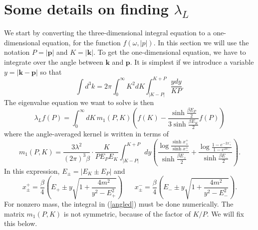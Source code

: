 \documentclass[12pt]{article}
\newcommand{\be}{\begin{equation}}
\newcommand{\ee}{\end{equation}}
\renewcommand{\k}{\mathbf{k}}
\newcommand{\p}{\mathbf{p}}
\begin{document}
\section{Some details on finding $\lambda_L$}\label{numericsapp}

We start by converting the three-dimensional integral equation to a one-dimensional equation, for the function $f(\omega,|p|)$. In this section we will use the notation $P = |\p|$ and $K = |\k|$. To get the one-dimensional equation, we have to integrate over the angle between $\k$ and $\p$. It is simplest if we introduce a variable $y = |\k - \p|$ so that
\be
\int d^3k = 2\pi \int_0^\infty K^2dK\int_{|K-P|}^{K+P} \frac{y dy}{KP}.
\ee
The eigenvalue equation we want to solve is then
\be
\lambda_L f(P) = \int_0^\infty dK \,m_1(P,K)\left(f(K) - \frac{\sinh \frac{\beta E_P}{2}}{3\sinh\frac{\beta E_K}{2}} f(P)\right)\ee
where the angle-averaged kernel is written in terms of 
\be
m_1(P,K) = \frac{3\lambda^2}{(2\pi)^3\beta}\cdot\frac{K}{P E_P E_K}\int_{|K-P|}^{K+P}dy\left(\frac{\log\frac{\sinh x_+^+}{\sinh x_-^+}}{\sinh \frac{\beta E_+}{2}} + \frac{\log\frac{1-e^{-2x^-_+}}{1-e^{2x^-_-}}}{\sinh\frac{\beta E_-}{2}}\right).\label{angled}
\ee
In this expression, $E_\pm = |E_K \pm E_P|$ and 
\be
x^+_\pm = \frac{\beta}{4}\left(E_+\pm y\sqrt{1 + \frac{4m^2}{y^2-E_+^2}}\right) \hspace{20pt} x^-_\pm = \frac{\beta}{4}\left(E_-\pm y\sqrt{1 + \frac{4m^2}{y^2-E_-^2}}\right).
\ee
For nonzero mass, the integral in (\ref{angled}) must be done numerically. The matrix $m_1(P,K)$ is not symmetric, because of the factor of $K/P$. We will fix this below.
\end{document}

